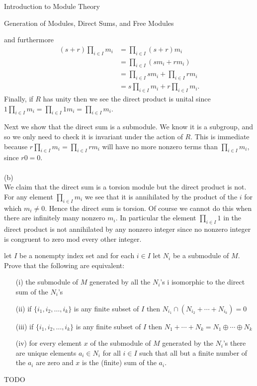 \begin{chapter}{Introduction to Module Theory}
\begin{section}{Generation of Modules, Direct Sums, and Free Modules}
\begin{solution}
\[\]
and furthermore\begin{align*}
(s+r)\prod_{i\in I}m_i &= \prod_{i\in I}(s+r)m_i\\
& = \prod_{i\in I}(sm_i+rm_i)\\
& = \prod_{i\in I}sm_i + \prod_{i\in I}rm_i\\
& = s\prod_{i\in I}m_i + r\prod_{i\in I}m_i.
\end{align*}
Finally, if $R$ has unity then we see the direct product is unital since $1\prod_{i\in I}m_i = \prod_{i\in I} 1m_i = \prod_{i\in I} m_i$.

Next we show that the direct sum is a submodule. We know it is a subgroup, and so we only need to check it is invariant under the action of $R$. This is immediate because $r\prod_{i\in I}m_i = \prod_{i\in I}rm_i$ will have no more nonzero terms than $\prod_{i\in I}m_i$, since $r0 = 0$. \\\\
(b)\\
We claim that the direct sum is a torsion module but the direct product is not. For any element $\prod_{i\in I}m_i$ we see that it is annihilated by the product of the $i$ for which $m_i\neq 0$. Hence the direct sum is torsion.  Of course we cannot do this when there are infinitely many nonzero $m_i$. In particular the element $\prod_{i\in I} 1$ in the direct product is not annihilated by any nonzero integer since no nonzero integer is congruent to zero mod every other integer. 
\end{solution}\oneperpage



\begin{problem}\label{ex:10.3.21}
let $I$ be a nonempty index set and for each $i\in I$ let $N_i$ be a submodule of $M$. Prove that the following are equivalent:\begin{enumerate}
\item[(i)] the submodule of $M$ generated by all the $N_i$'s i isomorphic to the direct sum of the $N_i$'s
\item[(ii)] if $\{i_1,i_2,\ldots,i_k\}$ is any finite subset of $I$ then $N_{i_1}\cap (N_{i_2}+\cdots +N_{i_k}) = 0$
\item[(iii)] if $\{i_1,i_2,\ldots,i_k\}$ is any finite subset of $I$ then $N_1+\cdots +N_k = N_1\oplus \cdots \oplus N_k$
\item[(iv)] for every element $x$ of the submodule of $M$ generated by the $N_i$'s there are unique elements $a_i\in N_i$ for all $i\in I$ such that all but a finite number of the $a_i$ are zero and $x$ is the (finite) sum of the $a_i$. 
\end{enumerate}
\end{problem}
\begin{solution}TODO


\end{solution}
\end{section}
\end{chapter}

